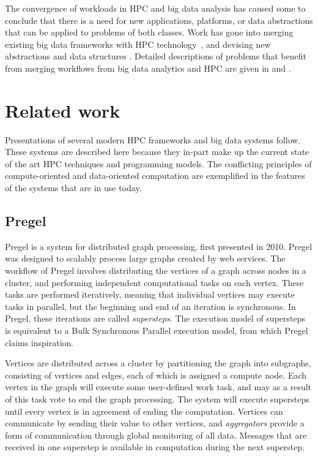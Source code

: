 \documentclass{uit-report}
\begin{document}
The convergence of workloads in HPC and big data analysis has caused some to conclude that there is a need for new applications, platforms, or data abstractions that can be applied to problems of both classes. Work has gone into merging existing big data frameworks with HPC technology~\cite{bridgingthegap, gittens2016matrix}, and devising new abstractions and data structures \cite{yang2017best}. Detailed descriptions of problems that benefit from merging workflows from big data analytics and HPC are given in \cite{subcommittee} and \cite{bigdataconvergence}.

\section{Related work} \label{section:relatedwork}
Presentations of several modern HPC frameworks and big data systems follow. These systems are described here because they in-part make up the current state of the art HPC techniques and programming models. The conflicting principles of compute-oriented and data-oriented computation are exemplified in the features of the systems that are in use today.

\subsection{Pregel}
Pregel \cite{pregel} is a system for distributed graph processing, first presented in 2010. Pregel was designed to scalably process large graphs created by web services. The workflow of Pregel involves distributing the vertices of a graph across nodes in a cluster, and performing independent computational tasks on each vertex. These tasks are performed iteratively, meaning that individual vertices may execute tasks in parallel, but the beginning and end of an iteration is synchronous. In Pregel, these iterations are called \emph{supersteps}. The execution model of supersteps is equivalent to a Bulk Synchronous Parallel execution model, from which Pregel claims inspiration. 

Vertices are distributed across a cluster by partitioning the graph into subgraphs, consisting of vertices and edges, each of which is assigned a compute node. Each vertex in the graph will execute some user-defined work task, and may as a result of this task vote to end the graph processing. The system will execute supersteps until every vertex is in agreement of ending the computation. Vertices can communicate by sending their value to other vertices, and \emph{aggregators} provide a form of communication through global monitoring of all data. Messages that are received in one superstep is available in computation during the next superstep.
\end{document}
